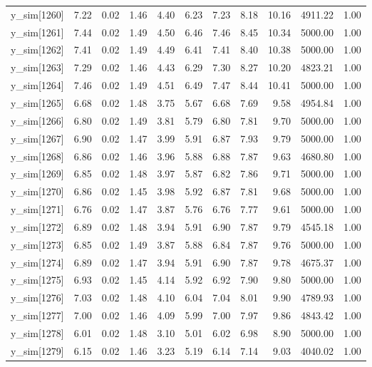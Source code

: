 \begin{table}[ht]
\begin{tabular}{rrrrrrrrrrr}
  y\_sim[1260] & 7.22 & 0.02 & 1.46 & 4.40 & 6.23 & 7.23 & 8.18 & 10.16 & 4911.22 & 1.00 \\ 
  y\_sim[1261] & 7.44 & 0.02 & 1.49 & 4.50 & 6.46 & 7.46 & 8.45 & 10.34 & 5000.00 & 1.00 \\ 
  y\_sim[1262] & 7.41 & 0.02 & 1.49 & 4.49 & 6.41 & 7.41 & 8.40 & 10.38 & 5000.00 & 1.00 \\ 
  y\_sim[1263] & 7.29 & 0.02 & 1.46 & 4.43 & 6.29 & 7.30 & 8.27 & 10.20 & 4823.21 & 1.00 \\ 
  y\_sim[1264] & 7.46 & 0.02 & 1.49 & 4.51 & 6.49 & 7.47 & 8.44 & 10.41 & 5000.00 & 1.00 \\ 
  y\_sim[1265] & 6.68 & 0.02 & 1.48 & 3.75 & 5.67 & 6.68 & 7.69 & 9.58 & 4954.84 & 1.00 \\ 
  y\_sim[1266] & 6.80 & 0.02 & 1.49 & 3.81 & 5.79 & 6.80 & 7.81 & 9.70 & 5000.00 & 1.00 \\ 
  y\_sim[1267] & 6.90 & 0.02 & 1.47 & 3.99 & 5.91 & 6.87 & 7.93 & 9.79 & 5000.00 & 1.00 \\ 
  y\_sim[1268] & 6.86 & 0.02 & 1.46 & 3.96 & 5.88 & 6.88 & 7.87 & 9.63 & 4680.80 & 1.00 \\ 
  y\_sim[1269] & 6.85 & 0.02 & 1.48 & 3.97 & 5.87 & 6.82 & 7.86 & 9.71 & 5000.00 & 1.00 \\ 
  y\_sim[1270] & 6.86 & 0.02 & 1.45 & 3.98 & 5.92 & 6.87 & 7.81 & 9.68 & 5000.00 & 1.00 \\ 
  y\_sim[1271] & 6.76 & 0.02 & 1.47 & 3.87 & 5.76 & 6.76 & 7.77 & 9.61 & 5000.00 & 1.00 \\ 
  y\_sim[1272] & 6.89 & 0.02 & 1.48 & 3.94 & 5.91 & 6.90 & 7.87 & 9.79 & 4545.18 & 1.00 \\ 
  y\_sim[1273] & 6.85 & 0.02 & 1.49 & 3.87 & 5.88 & 6.84 & 7.87 & 9.76 & 5000.00 & 1.00 \\ 
  y\_sim[1274] & 6.89 & 0.02 & 1.47 & 3.94 & 5.91 & 6.90 & 7.87 & 9.78 & 4675.37 & 1.00 \\ 
  y\_sim[1275] & 6.93 & 0.02 & 1.45 & 4.14 & 5.92 & 6.92 & 7.90 & 9.80 & 5000.00 & 1.00 \\ 
  y\_sim[1276] & 7.03 & 0.02 & 1.48 & 4.10 & 6.04 & 7.04 & 8.01 & 9.90 & 4789.93 & 1.00 \\ 
  y\_sim[1277] & 7.00 & 0.02 & 1.46 & 4.09 & 5.99 & 7.00 & 7.97 & 9.86 & 4843.42 & 1.00 \\ 
  y\_sim[1278] & 6.01 & 0.02 & 1.48 & 3.10 & 5.01 & 6.02 & 6.98 & 8.90 & 5000.00 & 1.00 \\ 
  y\_sim[1279] & 6.15 & 0.02 & 1.46 & 3.23 & 5.19 & 6.14 & 7.14 & 9.03 & 4040.02 & 1.00 \\ 

\end{tabular}
\end{table}
